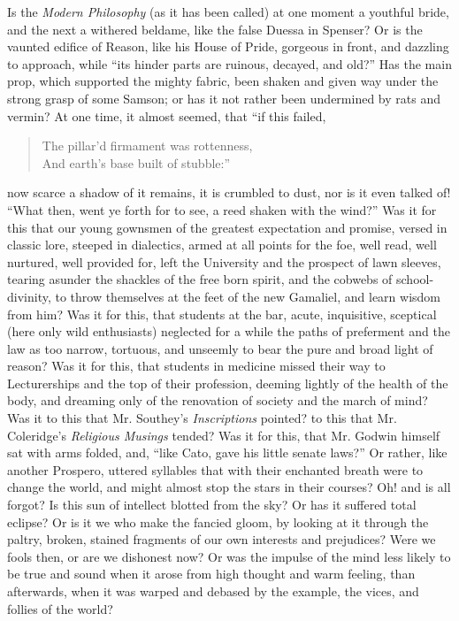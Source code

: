 Is the \emph{Modern Philosophy} (as it has been called) at one
moment a youthful bride, and the next a withered beldame, like the
false Duessa in Spenser? Or is the vaunted edifice of Reason, like
his House of Pride, gorgeous in front, and dazzling to approach,
while ``its hinder parts are ruinous, decayed, and old?'' Has the
main prop, which supported the mighty fabric, been shaken and
given way under the strong grasp of some Samson; or has it not
rather been undermined by rats and vermin? At one time, it almost
seemed, that ``if this failed,
\begin{quote}
  The pillar'd firmament was rottenness,
  \\ And earth's base built of stubble:''
\end{quote}
now scarce a shadow of it remains, it is crumbled to
dust, nor is it even talked of! ``What then, went ye forth for to
see, a reed shaken with the wind?'' Was it for this that our young
gownsmen of the greatest expectation and promise, versed in
classic lore, steeped in dialectics, armed at all points for the
foe, well read, well nurtured, well provided for, left the
University and the prospect of lawn sleeves, tearing asunder the
shackles of the free born spirit, and the cobwebs of
school-divinity, to throw themselves at the feet of the new
Gamaliel, and learn wisdom from him? Was it for this, that
students at the bar, acute, inquisitive, sceptical (here only wild
enthusiasts) neglected for a while the paths of preferment and the
law as too narrow, tortuous, and unseemly to bear the pure and
broad light of reason? Was it for this, that students in medicine
missed their way to Lecturerships and the top of their profession,
deeming lightly of the health of the body, and dreaming only of
the renovation of society and the march of mind? Was it to this
that Mr. Southey's \emph{Inscriptions} pointed? to this that Mr.
Coleridge's \emph{Religious Musings} tended? Was it for this, that
Mr. Godwin himself sat with arms folded, and, ``like Cato, gave
his little senate laws?'' Or rather, like another Prospero,
uttered syllables that with their enchanted breath were to change
the world, and might almost stop the stars in their courses? Oh!
and is all forgot? Is this sun of intellect blotted from the sky?
Or has it suffered total eclipse? Or is it we who make the fancied
gloom, by looking at it through the paltry, broken, stained
fragments of our own interests and prejudices? Were we fools then,
or are we dishonest now? Or was the impulse of the mind less
likely to be true and sound when it arose from high thought and
warm feeling, than afterwards, when it was warped and debased by
the example, the vices, and follies of the world?

